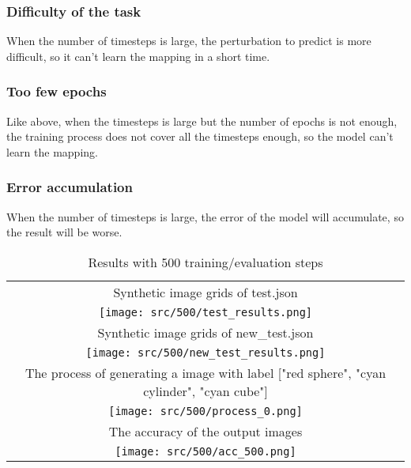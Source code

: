 \subsubsection{Difficulty of the task}
When the number of timesteps is large, the perturbation to predict is more difficult, so it can't learn the mapping in a short time.

\subsubsection{Too few epochs}
Like above, when the timesteps is large but the number of epochs is not enough, the training process does not cover all the timesteps enough, so the model can't learn the mapping.

\subsubsection{Error accumulation}
When the number of timesteps is large, the error of the model will accumulate, so the result will be worse.

\begin{table}[ht]
    \centering
    \begin{tabular}{|c|}
        \hline
        Synthetic image grids of test.json \\
        \texttt{[image: src/500/test\_results.png]} \\
        \hline
        Synthetic image grids of new\_test.json \\
        \texttt{[image: src/500/new\_test\_results.png]} \\
        \hline
        The process of generating a image with label ["red sphere", "cyan cylinder", "cyan cube"] \\
        \texttt{[image: src/500/process\_0.png]} \\
        \hline
        The accuracy of the output images \\
        \texttt{[image: src/500/acc\_500.png]} \\
        \hline
    \end{tabular}
    \caption{Results with 500 training/evaluation steps}
    \label{tab:500_steps}
\end{table}

